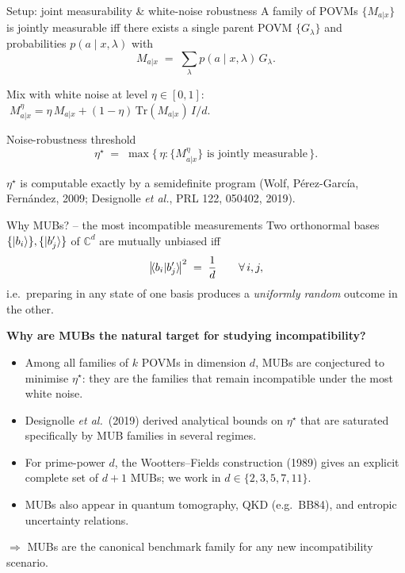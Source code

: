 \documentclass[10pt,aspectratio=169]{beamer}
\begin{document}
\begin{frame}{Setup: joint measurability \& white-noise robustness}
  A family of POVMs $\{M_{a|x}\}$ is \alert{jointly measurable} iff there exists a single parent POVM $\{G_\lambda\}$ and probabilities $p(a\mid x, \lambda)$ with
  \[
    M_{a|x} \;=\; \sum_\lambda p(a\mid x, \lambda)\,G_\lambda.
  \]

  Mix with white noise at level $\eta \in [0, 1]$:
  $\;M_{a|x}^\eta = \eta\,M_{a|x} + (1{-}\eta)\,\mathrm{Tr}(M_{a|x})\,I/d$.

  \medskip
  \begin{block}{Noise-robustness threshold}
    \[
      \eta^{\star} \;=\; \max\bigl\{\,\eta : \{M^\eta_{a|x}\}\text{ is jointly measurable}\,\bigr\}.
    \]
  \end{block}

  $\eta^{\star}$ is computable exactly by a \alert{semidefinite program} (Wolf, P{\'e}rez-Garc{\'i}a, Fern{\'a}ndez, 2009; Designolle \emph{et al.}, PRL 122, 050402, 2019).
\end{frame}

\begin{frame}{Why MUBs? -- the most incompatible measurements}
  Two orthonormal bases $\{\ket{b_i}\}, \{\ket{b'_j}\}$ of $\mathbb{C}^{d}$ are
  \alert{mutually unbiased} iff
  \[
    \bigl|\!\braket{b_i | b'_j}\!\bigr|^{2} \;=\; \frac{1}{d}
    \qquad \forall\, i, j,
  \]
  i.e.\ preparing in any state of one basis produces a \emph{uniformly random} outcome in the other.

  \medskip
  \textbf{Why are MUBs the natural target for studying incompatibility?}
  \begin{itemize}
    \item Among all families of $k$ POVMs in dimension $d$, MUBs are conjectured to \alert{minimise} $\eta^{\star}$: they are the families that remain incompatible under the \alert{most} white noise.
    \item Designolle \emph{et al.}\ (2019) derived analytical bounds on $\eta^{\star}$ that are saturated specifically by MUB families in several regimes.
    \item For prime-power $d$, the Wootters--Fields construction (1989) gives an explicit complete set of $d + 1$ MUBs; we work in $d \in \{2, 3, 5, 7, 11\}$.
    \item MUBs also appear in quantum tomography, QKD (e.g.\ BB84), and entropic uncertainty relations.
  \end{itemize}

  \medskip
  \alert{$\Rightarrow$ MUBs are the canonical benchmark family for any new incompatibility scenario.}
\end{frame}
\end{document}
